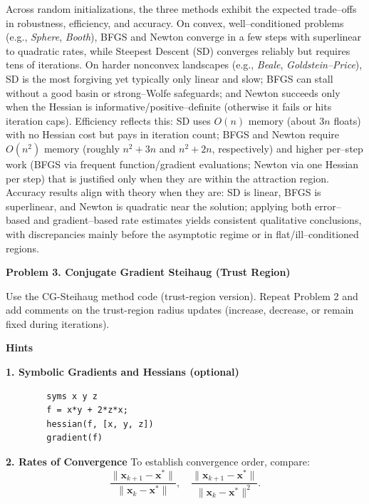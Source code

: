 \documentclass[11pt]{article}
\begin{document}
\begin{landscape}
\endgroup
\end{landscape}

	Across random initializations, the three methods exhibit the expected trade–offs in robustness, efficiency, and accuracy. On convex, well–conditioned problems (e.g., \emph{Sphere}, \emph{Booth}), BFGS and Newton converge in a few steps with superlinear to quadratic rates, while Steepest Descent (SD) converges reliably but requires tens of iterations. On harder nonconvex landscapes (e.g., \emph{Beale}, \emph{Goldstein–Price}), SD is the most forgiving yet typically only linear and slow; BFGS can stall without a good basin or strong–Wolfe safeguards; and Newton succeeds only when the Hessian is informative/positive–definite (otherwise it fails or hits iteration caps). Efficiency reflects this: SD uses \(O(n)\) memory (about \(3n\) floats) with no Hessian cost but pays in iteration count; BFGS and Newton require \(O(n^2)\) memory (roughly \(n^2{+}3n\) and \(n^2{+}2n\), respectively) and higher per–step work (BFGS via frequent function/gradient evaluations; Newton via one Hessian per step) that is justified only when they are within the attraction region. Accuracy results align with theory when they are: SD is linear, BFGS is superlinear, and Newton is quadratic near the solution; applying both error–based and gradient–based rate estimates yields consistent qualitative conclusions, with discrepancies mainly before the asymptotic regime or in flat/ill–conditioned regions.

	\newpage
	\noindent
	\textbf{Problem 3. Conjugate Gradient Steihaug (Trust Region)}
	
	Use the CG-Steihaug method code (trust-region version). Repeat Problem 2 and add comments on the trust-region radius updates (increase, decrease, or remain fixed during iterations).
	
	\medskip
	\noindent
	\textbf{Hints}
	
	\noindent
	\textbf{1. Symbolic Gradients and Hessians (optional)}
	\begin{verbatim}
		syms x y z
		f = x*y + 2*z*x;
		hessian(f, [x, y, z])
		gradient(f)
	\end{verbatim}
	
	\noindent
	\textbf{2. Rates of Convergence}
	To establish convergence order, compare:
	\[
	\frac{\|\bm{x}_{k+1}-\bm{x}^\ast\|}{\|\bm{x}_k-\bm{x}^\ast\|},
	\quad
	\frac{\|\bm{x}_{k+1}-\bm{x}^\ast\|}{\|\bm{x}_k-\bm{x}^\ast\|^2}.
	\]
	
	\newpage
\end{document}
